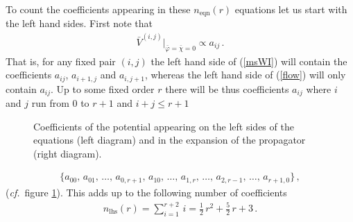 \documentclass[11pt]{book}
\newcommand\cf{\textit{cf.}\ }
\numberwithin{equation}{chapter}
\begin{document}
To count the coefficients appearing in these $n_{\text{eqn}}(r)$ equations let us start with the left hand sides.
First note that
\begin{align}
  \label{proportionality}
  \bar V^{(i,j)} \bigg|_{\bar\varphi = \bar\chi = 0}
  \propto a_{ij} \,.
\end{align}
That is, for any fixed pair $(i,j)$ the left hand side of (\ref{msWI}) will contain the coefficients
$a_{ij}$, $a_{i+1,j}$ and $a_{i,j+1}$, whereas the left hand side of (\ref{flow}) will only contain $a_{ij}$.
Up to some fixed order $r$ there will be thus coefficients $a_{ij}$ where $i$ and $j$ run from
$0$ to $r+1$ and $i+j \leqslant r+1$
\begin{figure}
  \begin{center}
    
    
  \end{center}
  \caption{
    Coefficients of the potential appearing on the left sides of the equations (left diagram)
    and in the expansion of the propagator (right diagram).
  }
  \label{fig:diag_lhs_rhs}
\end{figure}
\begin{align}
  \label{coeff_lhs}
  \bigg\lbrace
  a_{00},\, a_{01},\, \dots ,\, a_{0,r+1},\, a_{10},\, \dots ,\,
  a_{1,r},\, \dots ,\, a_{2,r-1},\, \dots,\, a_{r+1,0}
  \bigg\rbrace \,,
\end{align}
(\cf figure \ref{fig:diag_lhs_rhs}). This adds up to the following number of coefficients
\begin{align}
  n_{\text{lhs}}(r) = \sum_{i=1}^{r+2} \, i = \frac{1}{2} \, r^2 + \frac{5}{2} \, r + 3 \,.
\end{align}
\end{document}
